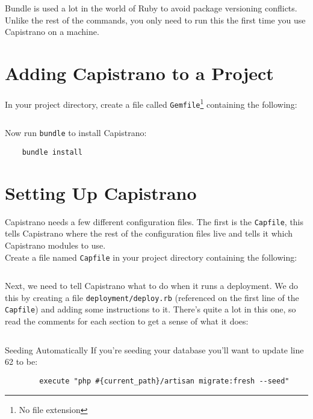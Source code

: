 Bundle is used a lot in the world of Ruby to avoid package versioning conflicts. Unlike the rest of the commands, you only need to run this the first time you use Capistrano on a machine.


\section{Adding Capistrano to a Project}

In your project directory, create a file called \texttt{Gemfile}\footnote{No file extension} containing the following:

\inputminted{ruby}{04/resources/02/01-Gemfile}

Now run \texttt{bundle} to install Capistrano:

\begin{verbatim}
    bundle install
\end{verbatim}


\section{Setting Up Capistrano}

Capistrano needs a few different configuration files. The first is the \texttt{Capfile}, this tells Capistrano where the rest of the configuration files live and tells it which Capistrano modules to use.
\\

Create a file named \texttt{Capfile} in your project directory containing the following:

\inputminted{ruby}{04/resources/02/02-Capfile}

Next, we need to tell Capistrano what to do when it runs a deployment. We do this by creating a file \texttt{deployment/deploy.rb} (referenced on the first line of the \texttt{Capfile}) and adding some instructions to it. There's quite a lot in this one, so read the comments for each section to get a sense of what it does:

\inputminted{ruby}{04/resources/02/03-deploy.rb}

\begin{infobox}{Seeding Automatically}
    If you're seeding your database you'll want to update line 62 to be:

    \begin{verbatim}
        execute "php #{current_path}/artisan migrate:fresh --seed"
    \end{verbatim}
\end{infobox}


